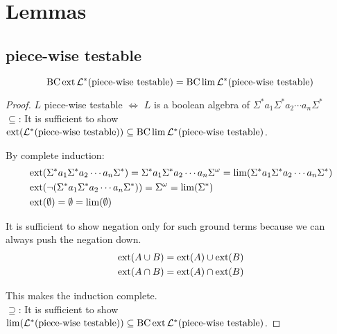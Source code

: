 \section{Lemmas}

\subsection{piece-wise testable}

\begin{thm}
\[ \operatorname{BC} \operatorname{ext} \mathcal{L}^* (\textup{\textrm{piece-wise testable}}) = \operatorname{BC} \lim \mathcal{L}^* (\textup{\textrm{piece-wise testable}}) \]
\end{thm}

\begin{proof}

$L$ piece-wise testable $\Leftrightarrow$ $L$ is a boolean algebra of $\Sigma^* a_1 \Sigma^* a_2 \dotsb a_n \Sigma^*$
\\

$\subseteq$: It is sufficient to show $\operatorname{ext}(\mathcal{L}^* (\textup{\textrm{piece-wise testable}})) \subseteq \operatorname{BC} \lim \mathcal{L}^* (\textup{\textrm{piece-wise testable}})$.

By complete induction:
\begin{align*}
& \operatorname{ext}(\Sigma^* a_1 \Sigma^* a_2 \dotsb a_n \Sigma^*) = \Sigma^* a_1 \Sigma^* a_2 \dotsb a_n \Sigma^\omega = \lim(\Sigma^* a_1 \Sigma^* a_2 \dotsb a_n \Sigma^*) \\
& \operatorname{ext}( \neg ( \Sigma^* a_1 \Sigma^* a_2 \dotsb a_n \Sigma^* )) = \Sigma^\omega = \lim( \Sigma^* ) \\
& \operatorname{ext}( \emptyset ) = \emptyset = \lim(\emptyset)
\end{align*}

It is sufficient to show negation only for such ground terms because we can always push the negation down.
\begin{align*}
& \operatorname{ext}(A \cup B) = \operatorname{ext}(A) \cup \operatorname{ext}(B) \\
& \operatorname{ext}(A \cap B) = \operatorname{ext}(A) \cap \operatorname{ext}(B)
\end{align*}

This makes the induction complete.
\\

$\supseteq$: It is sufficient to show $\lim(\mathcal{L}^* (\textup{\textrm{piece-wise testable}})) \subseteq \operatorname{BC} \operatorname{ext} \mathcal{L}^* (\textup{\textrm{piece-wise testable}})$.


\end{proof}
